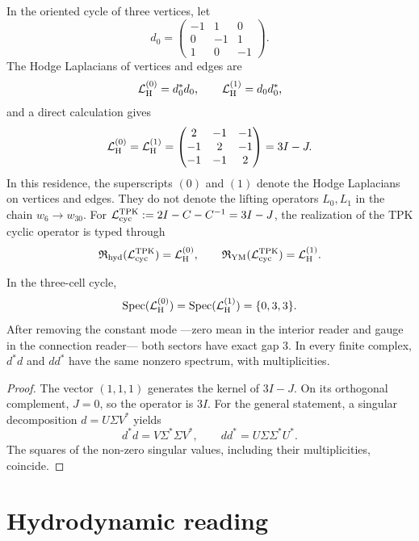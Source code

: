 In the oriented cycle of three vertices, let
\[
 d_0=
 \begin{pmatrix}
 -1&1&0\\
 0&-1&1\\
 1&0&-1
 \end{pmatrix}.
\]
The Hodge Laplacians of vertices and edges are
\[
 \mathcal L_{\rm H}^{(0)}=d_0^\ast d_0,
 \qquad
 \mathcal L_{\rm H}^{(1)}=d_0d_0^\ast,
\]
and a direct calculation gives
\[
 \mathcal L_{\rm H}^{(0)}=\mathcal L_{\rm H}^{(1)}=
 \begin{pmatrix}
 2&-1&-1\\
 -1&2&-1\\
 -1&-1&2
 \end{pmatrix}
 =3I-J.
\]
In this residence, the superscripts \((0)\) and \((1)\) denote the
Hodge Laplacians on vertices and edges. They do not denote the
lifting operators \(L_0,L_1\) in the chain \(w_6\to w_{30}\). For
\(\mathcal L_{\rm cyc}^{\rm TPK}:=2I-C-C^{-1}=3I-J\), the realization of the
TPK cyclic operator is typed through
\[
 \mathfrak R_{\rm hyd}(\mathcal L_{\rm cyc}^{\rm TPK})
 =\mathcal L_{\rm H}^{(0)},\qquad
 \mathfrak R_{\rm YM}(\mathcal L_{\rm cyc}^{\rm TPK})
 =\mathcal L_{\rm H}^{(1)}.
\]

\begin{theorem}
\label{thm:operador-comun-frontera-ns-ym}
In the three-cell cycle,
\[
 \operatorname{Spec}(\mathcal L_{\rm H}^{(0)})
 =\operatorname{Spec}(\mathcal L_{\rm H}^{(1)})
 =\{0,3,3\}.
\]
After removing the constant mode ---zero mean in the interior reader and
gauge in the connection reader--- both sectors have exact gap \(3\).
In every finite complex, \(d^\ast d\) and \(dd^\ast\) have the same nonzero
spectrum, with multiplicities.
\end{theorem}

\begin{proof}
The vector \((1,1,1)\) generates the kernel of \(3I-J\). On its orthogonal
complement, \(J=0\), so the operator is \(3I\). For the
general statement, a singular decomposition \(d=U\Sigma V^\ast\) yields
\[
 d^\ast d=V\Sigma^\ast\Sigma V^\ast,
 \qquad
 dd^\ast=U\Sigma\Sigma^\ast U^\ast.
\]
The squares of the non-zero singular values, including their multiplicities, coincide.
\end{proof}

\section{Hydrodynamic reading}

